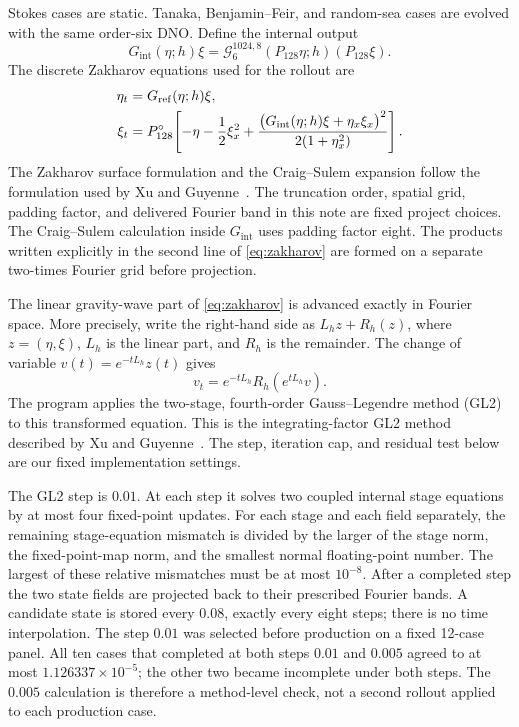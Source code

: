 \documentclass[10pt]{article}
\newcommand{\Gref}{G_{\mathrm{ref}}}
\newcommand{\Gint}{G_{\mathrm{int}}}
\begin{document}
Stokes cases are static.  Tanaka, Benjamin--Feir, and random-sea cases are
evolved with the same order-six DNO.  Define the internal output
\[
  \Gint(\eta;h)\xi
  =
  \mathcal G_{6}^{1024,8}
    (P_{128}\eta;h)(P_{128}\xi).
\]
The discrete Zakharov equations used for the rollout are
\begin{align}
  \eta_t
  &=
  \Gref(\eta;h)\xi, \notag\\
  \xi_t
  &=
  P_{128}^{\circ}\!\left[
    -\eta-\frac12\xi_x^2
    +\frac{
      \bigl(\Gint(\eta;h)\xi+\eta_x\xi_x\bigr)^2
    }{2(1+\eta_x^2)}
  \right].
  \label{eq:zakharov}
\end{align}
The Zakharov surface formulation and the Craig--Sulem expansion follow the
formulation used by Xu and Guyenne~\cite{xu2009}.  The truncation order,
spatial grid, padding factor, and delivered Fourier band in this note are
fixed project choices.
The Craig--Sulem calculation inside $\Gint$ uses padding factor eight.  The
products written explicitly in the second line of \eqref{eq:zakharov} are
formed on a separate two-times Fourier grid before projection.

The linear gravity-wave part of \eqref{eq:zakharov} is advanced exactly in
Fourier space.  More precisely, write the right-hand side as
$L_hz+R_h(z)$, where $z=(\eta,\xi)$, $L_h$ is the linear part, and $R_h$ is
the remainder.  The change of variable
$v(t)=e^{-tL_h}z(t)$ gives
\[
  v_t=e^{-tL_h}R_h(e^{tL_h}v).
\]
The program applies the two-stage, fourth-order Gauss--Legendre method
(GL2) to this transformed equation.  This is the integrating-factor GL2
method described by Xu and Guyenne~\cite{xu2009}.  The step, iteration cap,
and residual test below are our fixed implementation settings.

The GL2 step is $0.01$.  At each step it solves two coupled internal stage
equations by at most four fixed-point updates.  For each stage and each
field separately, the remaining stage-equation mismatch is divided by the
larger of the stage norm, the fixed-point-map norm, and the smallest normal
floating-point number.  The largest of these relative mismatches must be at
most $10^{-8}$.  After a completed step the two state fields are projected
back to their prescribed Fourier bands.  A candidate state is stored every
$0.08$, exactly every eight steps; there is no time interpolation.
The step \(0.01\) was selected before production on a fixed 12-case panel.
All ten cases that completed at both steps \(0.01\) and \(0.005\) agreed to
at most \(1.126337\times10^{-5}\); the other two became incomplete under
both steps.  The \(0.005\) calculation is therefore a method-level check, not
a second rollout applied to each production case.
\end{document}
